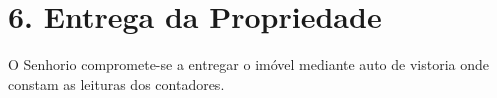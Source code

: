 \section*{6. Entrega da Propriedade}
O Senhorio compromete-se a entregar o imóvel mediante auto de vistoria onde constam as leituras dos contadores.
